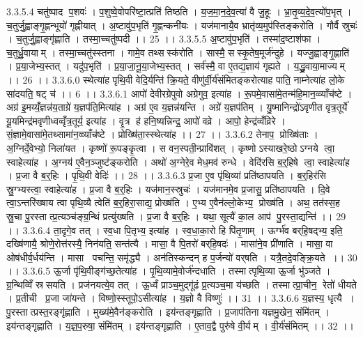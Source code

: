 3.3.5.4
चतु॑ष्पाद प॒शवः॑ । प॒शुष्वे॒वोपरि॑ष्टा॒त्प्रति॑ तिष्ठति । य॒ज॒मा॒न॒दे॒व॒त्या॑ वै जु॒हूः । भ्रा॒तृ॒व्य॒दे॒व॒त्यो॑प॒भृत् । च॒तुर्जु॒ह्वाङ्गृ॒ह्णन्भूयो॑ गृह्णीयात् । अ॒ष्टावु॑प॒भृति॑ गृ॒ह्णन्कनी॑यः । यज॑मानायै॒व भ्रातृ॑व्य॒मुप॑स्तिङ्करोति । गौर्वै स्रुचः॑ । च॒तुर्जु॒ह्वाङ्गृ॑ह्णाति । तस्मा॒च्चतु॑ष्पदी ।। 25 ।।
3.3.5.5
अ॒ष्टावु॑प॒भृति॑ । तस्मा॑द॒ष्टाश॑फा । च॒तुर्ध्रु॒वायाम् । तस्मा॒च्चतु॑स्स्तना । गामे॒व तथ्सस्क॑रोति । सास्मै॒ सस्कृ॒तेष॒मूर्ज॑न्दुहे । यज्जु॒ह्वाङ्गृ॒ह्णाति॑ । प्र॒या॒जेभ्य॒स्तत् । यदु॑प॒भृति॑ । प्र॒या॒जा॒नू॒या॒जेभ्य॒स्तत् । सर्व॑स्मै॒ वा ए॒तद्य॒ज्ञाय॑ गृह्यते । य॒द्ध्रु॒वाया॒माज्यम् ।। 26 ।।
3.3.6.0
स्थेत्या॑ह पृथि॒वी वेदि॒र्यन्ति॑ क्रि॒यते॒ वीणु॑र्वी॒र्य॑संमितङ्करोत्याह पाति॒ नाम्नेत्या॑ह लो॒के सा॑दयति॒ षट् च॑ ।। 6 ।।
3.3.6.1
आपो॑ देवीरग्रेपुवो अग्रेगुव॒ इत्या॑ह । रू॒पमे॒वासा॑मे॒तन्म॑हि॒मान॒व्व्याँच॑ष्टे । अग्र॑ इ॒मय्यँ॒ज्ञन्न॑य॒ताग्रे॑ य॒ज्ञप॑ति॒मित्या॑ह । अग्र॑ ए॒व य॒ज्ञन्न॑यन्ति । अग्रे॑ य॒ज्ञप॑तिम् । यु॒ष्मानिन्द्रो॑ऽवृणीत वृत्र॒तूर्ये॑ यू॒यमिन्द्र॑मवृणीध्वव्वृँत्र॒तूर्य॒ इत्या॑ह । वृ॒त्र ह॑ हनि॒ष्यन्निन्द्र॒ आपो॑ वव्रे । आपो॒ हेन्द्र॑व्वँव्रिरे । सं॒ज्ञामे॒वासा॑मे॒तथ्सामा॑न॒व्व्याँच॑ष्टे । प्रोख्षि॑ता॒स्स्थेत्या॑ह ।। 27 ।।
3.3.6.2
तेनाप॒ प्रोख्षि॑ताः । अ॒ग्निर्दे॒वेभ्यो॒ निला॑यत । कृष्णो॑ रू॒पङ्कृ॒त्वा । स वन॒स्पती॒न्प्रावि॑शत् । कृष्णोऽस्याखरे॒ष्ठोऽग्नये त्वा॒ स्वाहेत्या॑ह । अ॒ग्नय॑ ए॒वैन॒ञ्जुष्ट॑ङ्करोति । अथो॑ अ॒ग्नेरे॒व मेध॒मव॑ रुन्धे । वेदि॑रसि ब॒र्॒हिषे त्वा॒ स्वाहेत्या॑ह । प्र॒जा वै ब॒र्॒हिः । पृ॒थि॒वी वेदिः॑ ।। 28 ।।
3.3.6.3
प्र॒जा ए॒व पृ॑थि॒व्यां प्रति॑ष्ठापयति । ब॒र्॒हिर॑सि स्रु॒ग्भ्यस्त्वा॒ स्वाहेत्या॑ह । प्र॒जा वै ब॒र्॒हिः । यज॑मान॒स्स्रुचः॑ । यज॑मानमे॒व प्र॒जासु॒ प्रति॑ष्ठापयति । दि॒वे त्वा॒ऽन्तरि॑ख्षाय त्वा पृथि॒व्यै त्वेति॑ ब॒र्॒हिरा॒साद्य॒ प्रोख्ष॑ति । ए॒भ्य ए॒वैन॑ल्लो॒केभ्य॒ प्रोख्ष॑ति । अथ॒ तत॑स्स॒ह स्रु॒चा पु॒रस्तात्प्र॒त्यञ्च॑ङ्ग्र॒न्थिं प्रत्यु॑ख्षति । प्र॒जा वै ब॒र्॒हिः । यथा॒ सूत्यै॑ का॒ल आप॑ पु॒रस्ता॒द्यन्ति॑ ।। 29 ।।
3.3.6.4
ता॒दृगे॒व तत् । स्व॒धा पि॒तृभ्य॒ इत्या॑ह । स्व॒धा॒का॒रो हि पि॑तृ॒णाम् । ऊर्ग्भ॑व बर्‌हि॒षद्भ्य॒ इति॒ दख्षि॑णायै॒ श्रोणे॒रोत्त॑रस्यै॒ निन॑यति॒ सन्त॑त्यै । मासा॒ वै पि॒तरो॑ बर्‌हि॒षदः॑ । मासा॑ने॒व प्री॑णाति । मासा॒ वा ओष॑धीर्व॒र्धय॑न्ति । मासा पचन्ति॒ समृ॑द्ध्यै । अन॑तिस्कन्दन् ह प॒र्जन्यो॑ वर्‌षति । यत्रै॒तदे॒वङ्क्रि॒यते ।। 30 ।।
3.3.6.5
ऊ॒र्जा पृ॑थि॒वीङ्ग॑च्छ॒तेत्या॑ह । पृ॒थि॒व्यामे॒वोर्ज॑न्दधाति । तस्मात्पृथि॒व्या ऊ॒र्जा भु॑ञ्जते । ग्र॒न्थिव्विँ स्र॑सयति । प्रज॑नयत्ये॒व तत् । ऊ॒र्ध्वं प्राञ्च॒मुद्गू॑ढं प्र॒त्यञ्च॒मा य॑च्छति । तस्मात्प्रा॒चीन॒॒ रेतो॑ धीयते । प्र॒तीची प्र॒जा जा॑यन्ते । विष्णो॒स्स्तूपो॒ऽसीत्या॑ह । य॒ज्ञो वै विष्णुः॑ ।। 31 ।।
3.3.6.6
य॒ज्ञस्य॒ धृत्यै । पु॒रस्तात्प्रस्त॒रङ्गृ॑ह्णाति । मुख्य॑मे॒वैन॑ङ्करोति । इय॑न्तङ्गृह्णाति । प्र॒जाप॑तिना यज्ञमु॒खेन॒ संमि॑तम् । इय॑न्तङ्गृह्णाति । य॒ज्ञ॒प॒रुषा॒ संमि॑तम् । इय॑न्तङ्गृह्णाति । ए॒ताव॒द्वै पुरु॑षे वी॒र्यम् । वी॒र्य॑संमितम् ।। 32 ।।
